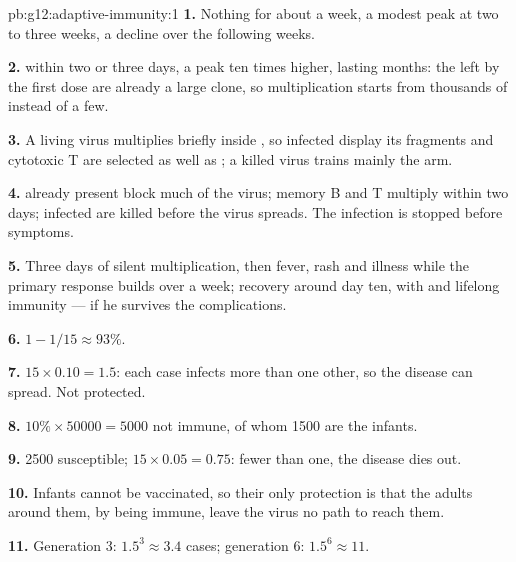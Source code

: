 \begin{solution}{pb:g12:adaptive-immunity:1}
\textbf{1.} Nothing for about a week, a modest peak at two to three
weeks, a decline over the following weeks.

\textbf{2.}  within two or three days, a peak ten times
higher, lasting months: the  left by the first dose are
already a large clone, so multiplication starts from thousands of
 instead of a few.

\textbf{3.} A living virus multiplies briefly inside , so
infected  display its fragments and cytotoxic T  are
selected as well as ; a killed virus trains mainly the
 arm.

\textbf{4.}  already present block much of the virus;
memory B and T  multiply within two days; infected  are
killed before the virus spreads. The infection is stopped before
symptoms.

\textbf{5.} Three days of silent multiplication, then fever, rash and
illness while the primary response builds over a week; recovery
around day ten, with  and lifelong immunity --- if he
survives the complications.

\textbf{6.} $1 - 1/15 \approx 93\%$.

\textbf{7.} $15 \times 0.10 = 1.5$: each case infects more than one
other, so the disease can spread. Not protected.

\textbf{8.} $10\% \times \num{50000} = 5000$ not immune, of whom 1500
are the infants.

\textbf{9.} 2500 susceptible; $15 \times 0.05 = 0.75$: fewer than one,
the disease dies out.

\textbf{10.} Infants cannot be vaccinated, so their only protection is
that the adults around them, by being immune, leave the virus no path
to reach them.

\textbf{11.} Generation 3: $1.5^3 \approx 3.4$ cases; generation 6:
$1.5^6 \approx 11$.


\end{solution}
